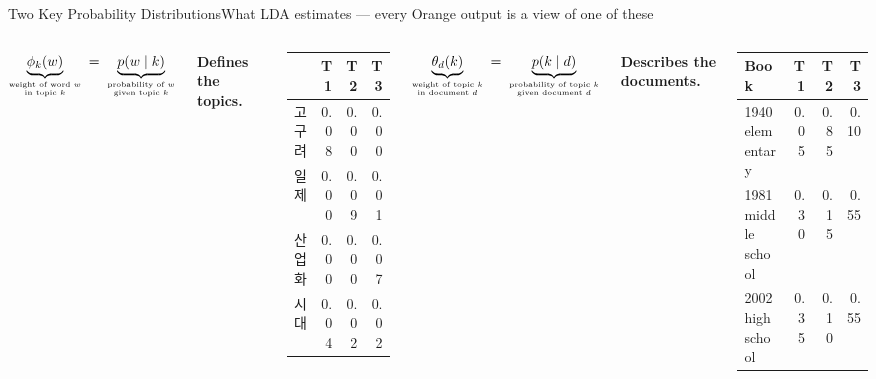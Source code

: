 \documentclass[aspectratio=169,10pt]{beamer}
\begin{document}
\begin{frame}{Two Key Probability Distributions}{What LDA estimates --- every Orange output is a view of one of these}
  \begin{columns}[T, onlytextwidth]
      \begin{center}
        $\underbrace{\phi_k(w)}_{\substack{\text{\tiny weight of word $w$}\\ \text{\tiny in topic $k$}}} \;=\; \underbrace{p(w \mid k)}_{\substack{\text{\tiny probability of $w$}\\ \text{\tiny given topic $k$}}}$
      \end{center}
      \vspace{0.4em}
      \centerline{\textbf{Defines the topics.}}
      \vspace{0.2em}
      \begin{center}
        \scriptsize
        \begin{tabular}{@{}l r r r@{}}
          \toprule
            & T1 & T2 & T3 \\
          \midrule
          고구려   & 0.08 & 0.00 & 0.00 \\
          일제    & 0.00 & 0.09 & 0.01 \\
          산업화  & 0.00 & 0.00 & 0.07 \\
          시대    & 0.04 & 0.02 & 0.02 \\
          \bottomrule
        \end{tabular}
      \end{center}

      \begin{center}
        $\underbrace{\theta_d(k)}_{\substack{\text{\tiny weight of topic $k$}\\ \text{\tiny in document $d$}}} \;=\; \underbrace{p(k \mid d)}_{\substack{\text{\tiny probability of topic $k$}\\ \text{\tiny given document $d$}}}$
      \end{center}
      \vspace{0.4em}
      \centerline{\textbf{Describes the documents.}}
      \vspace{0.2em}
      \begin{center}
        \scriptsize
        \begin{tabular}{@{}l r r r@{}}
          \toprule
          Book & T1 & T2 & T3 \\
          \midrule
          1940 elementary     & 0.05 & 0.85 & 0.10 \\
          1981 middle school  & 0.30 & 0.15 & 0.55 \\
          2002 high school    & 0.35 & 0.10 & 0.55 \\
          \bottomrule
        \end{tabular}
      \end{center}
  \end{columns}

\end{frame}
\end{document}

